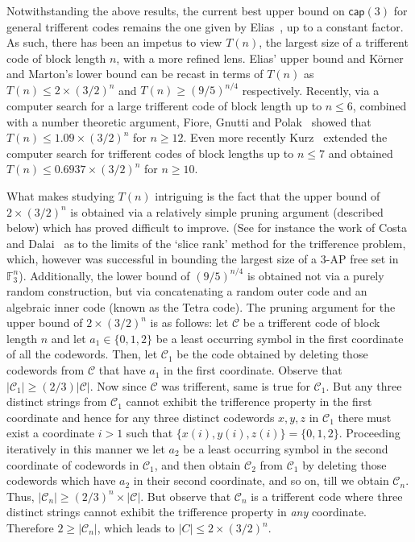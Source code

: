 \documentclass[10pt,a4paper]{article}
\newcommand{\F}{\mathbb{F}}
\newcommand{\calC}{\mathcal{C}}
\newcommand{\set}[1]{\{#1\}}
\newcommand{\bcap}{\mathsf{cap}}
\DeclareMathOperator{\1}{\mathbf{1}}
\begin{document}
Notwithstanding the above results, the current best upper bound on $\bcap(3)$ for general trifferent codes remains the one given by Elias~\cite{Elias1988}, up to a constant factor. 
As such, there has been an impetus to view $T(n)$, the largest size of a trifferent code of block length $n$, with a more refined lens.
Elias' upper bound and K\"{o}rner and Marton's lower bound can be recast in terms of $T(n)$ as $T(n)\leq 2\times (3/2)^n$ and $T(n)\geq (9/5)^{n/4}$ respectively.
Recently, via a computer search for a large trifferent code of block length up to $n \leq 6$, combined with a number theoretic argument, Fiore, Gnutti and Polak~\cite{FIOREGP2022} showed that $T(n) \leq 1.09\times (3/2)^n$ for $n\geq 12$.
Even more recently Kurz~\cite{Kurz2023trifferent} extended the computer search for trifferent codes of block lengths up to $n\leq 7$ and obtained $T(n)\leq 0.6937\times (3/2)^n$ for $n\geq 10$. 

What makes studying $T(n)$ intriguing is the fact that the upper bound of $2\times (3/2)^n$ is obtained via a relatively simple pruning argument (described below) which has proved difficult to improve.
(See for instance the work of Costa and Dalai~\cite{COSTAD2021} as to the limits of the `slice rank' method for the trifference problem, which, however was successful in bounding the largest size of a $3$-AP free set in $\F_3^n$).
Additionally, the lower bound of $(9/5)^{n/4}$ is obtained not via a purely random construction, but via concatenating a random outer code and an algebraic inner code (known as the Tetra code).
The pruning argument for the upper bound of $2\times (3/2)^n$ is as follows: let $\calC$ be a trifferent code of block length $n$ and let $a_1\in \set{0, 1, 2}$ be a least occurring symbol in the first coordinate of all the codewords.
Then, let $\calC_1$ be the code obtained by deleting those codewords from $\calC$ that have $a_1$ in the first coordinate.
Observe that $|\calC_1| \geq (2/3)|\calC|$.
Now since $\mathcal C$ was trifferent, same is true for $\mathcal C_1$.
But any three distinct strings from $\mathcal C_1$ cannot exhibit the trifference property in the first coordinate and hence for any three distinct codewords $x, y, z$ in $\calC_1$ there must exist a coordinate $i > 1$ such that $\set{x(i),y(i),z(i)} = \set{0,1,2}$.
Proceeding iteratively in this manner we let $a_2$ be a least occurring symbol in the second coordinate of codewords in $\calC_1$, and then obtain $\calC_2$ from $\calC_1$ by deleting those codewords which have $a_2$ in their second coordinate, and so on, till we obtain $\calC_n$.
Thus, $|\calC_n|\geq (2/3)^n\times|\calC|$.
But observe that $\mathcal C_n$ is a trifferent code where three distinct strings cannot exhibit the trifference property in \emph{any} coordinate.
Therefore $2\geq |\mathcal C_n|$, which leads to $|C|\leq 2\times (3/2)^n$.
\end{document}
